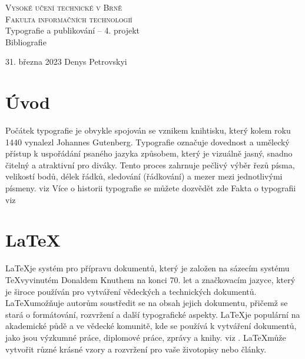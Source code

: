 \documentclass[a4paper, 11pt]{article}
\begin{document}
\begin{titlepage}
    \begin{center}
        {\Huge\textsc{Vysoké učení technické v Brně} \\}
        \huge
        \textsc{Fakulta informačních technologií}\\
            \LARGE
            Typografie a publikování -- 4. projekt \\
            \Huge
            Bibliografie
    \end{center}
    {\Large 31. března 2023 \hfill Denys Petrovskyi}
\end{titlepage}

\section{Úvod}
Počátek typografie je obvykle spojován se vznikem knihtisku, který kolem roku 1440 vynalezl Johannes Gutenberg.
Typografie označuje dovednost a umělecký přístup k uspořádání psaného jazyka způsobem, 
který je vizuálně jasný, snadno čitelný a atraktivní pro diváky. Tento proces zahrnuje pečlivý výběr řezů písma, 
velikostí bodů, délek řádků, sledování (řádkování) a mezer mezi jednotlivými písmeny. viz \cite{OdbornyText}
Více o historii typografie se můžete dozvědět zde \cite{BakalarPrace1}
Fakta o typografii viz \cite{Article}
\section{\LaTeX}

\LaTeX je systém pro přípravu dokumentů, který je založen na sázecím systému 
\TeX vyvinutém Donaldem Knuthem na konci 70. let a značkovacím jazyce, který je 
široce používán pro vytváření vědeckých a technických dokumentů. \LaTeX umožňuje 
autorům soustředit se na obsah jejich dokumentu, přičemž se stará o formátování, 
rozvržení a další typografické aspekty. \LaTeX je populární na akademické půdě a ve 
vědecké komunitě, kde se používá k vytváření dokumentů, jako jsou výzkumné práce, 
diplomové práce, zprávy a knihy. viz \cite{WhyLatex}. \LaTeX může vytvořit různé krásné vzory 
a rozvržení pro vaše životopisy nebo články. \cite{FullArticle}
\end{document}
